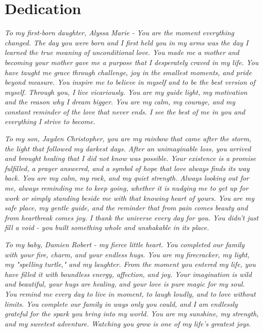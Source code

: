 
%
%
%


\chapter*{Dedication}
\textit{To my first-born daughter, Alyssa Marie - You are the moment everything changed. The day you were born and I first held you in my arms was the day I learned the true meaning of unconditional love. You made me a mother and becoming your mother gave me a purpose that I desperately craved in my life. You have taught me grace through challenge, joy in the smallest moments, and pride beyond measure. You inspire me to believe in myself and to be the best version of myself. Through you, I live vicariously. You are my guide light, my motivation and the reason why I dream bigger. You are my calm, my courage, and my constant reminder of the love that never ends. I see the best of me in you and everything I strive to become.
}


\textit{To my son, Jayden Christopher, you are my rainbow that came after the storm, the light that followed my darkest days. After an unimaginable loss, you arrived and brought healing that I did not know was possible. Your existence is a promise fulfilled, a prayer answered, and a symbol of hope that love always finds its way back. You are my calm, my rock, and my quiet strength. Always looking out for me, always reminding me to keep going, whether it is nudging me to get up for work or simply standing beside me with that knowing heart of yours. You are my safe place, my gentle guide, and the reminder that from pain comes beauty and from heartbreak comes joy. I thank the universe every day for you. You didn't just fill a void - you built something whole and unshakable in its place.
}


\textit{To my baby, Damien Robert - my fierce little heart. You completed our family with your fire, charm, and your endless hugs. You are my firecracker, my light, my "spelling turtle," and my laughter. From the moment you entered my life, you have filled it with boundless energy, affection, and joy. Your imagination is wild and beautiful, your hugs are healing, and your love is pure magic for my soul. You remind me every day to live in moment, to laugh loudly, and to love without limits. You complete our family in ways only you could, and I am endlessly grateful for the spark you bring into my world. You are my sunshine, my strength, and my sweetest adventure. Watching you grow is one of my life's greatest joys.
}

